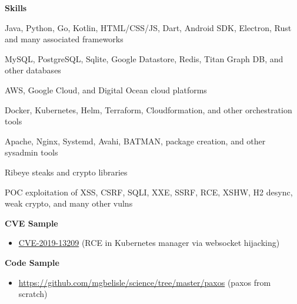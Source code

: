 \documentclass[10pt, a4paper]{article}
\begin{document}
\textbf{Skills}
\begin{itemize*}
  \item Java, Python, Go, Kotlin, HTML/CSS/JS, Dart, Android SDK, Electron, Rust and many associated frameworks
  \item MySQL, PostgreSQL, Sqlite, Google Datastore, Redis, Titan Graph DB, and other databases
  \item AWS, Google Cloud, and Digital Ocean cloud platforms
  \item Docker, Kubernetes, Helm, Terraform, Cloudformation, and other orchestration tools
  \item Apache, Nginx, Systemd, Avahi, BATMAN, package creation, and other sysadmin tools
  \item Ribeye steaks and crypto libraries
  \item POC exploitation of XSS, CSRF, SQLI, XXE, SSRF, RCE, XSHW, H2 desync, weak crypto, and many other vulns
\end{itemize*}
\textbf{CVE Sample}
\begin{itemize}
  \item[] \href{https://cve.mitre.org/cgi-bin/cvename.cgi?name=CVE-2019-13209}{CVE-2019-13209} (RCE in Kubernetes manager via websocket hijacking)
\end{itemize}
\textbf{Code Sample}
\begin{itemize}
  \item[] \url{https://github.com/mgbelisle/science/tree/master/paxos} (paxos from scratch)
\end{itemize}
\end{document}
